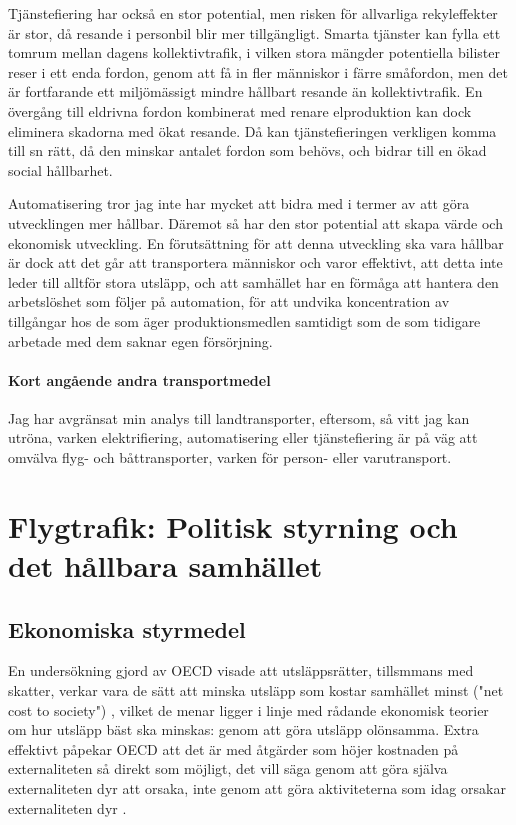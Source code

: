 \documentclass{article}
\begin{document}
Tjänstefiering har också en stor potential, men risken för allvarliga rekyleffekter är stor, då resande i personbil blir mer tillgängligt. Smarta tjänster kan fylla ett tomrum mellan dagens kollektivtrafik, i vilken stora mängder potentiella bilister reser i ett enda fordon, genom att få in fler människor i färre småfordon, men det är fortfarande ett miljömässigt mindre hållbart resande än kollektivtrafik. En övergång till eldrivna fordon kombinerat med renare elproduktion kan dock eliminera skadorna med ökat resande. Då kan tjänstefieringen verkligen komma till sn rätt, då den minskar antalet fordon som behövs, och bidrar till en ökad social hållbarhet.

Automatisering tror jag inte har mycket att bidra med i termer av att göra utvecklingen mer hållbar. Däremot så har den stor potential att skapa värde och ekonomisk utveckling. En förutsättning för att denna utveckling ska vara hållbar är dock att det går att transportera människor och varor effektivt, att detta inte leder till alltför stora utsläpp, och att samhället har en förmåga att hantera den arbetslöshet som följer på automation, för att undvika koncentration av tillgångar hos de som äger produktionsmedlen samtidigt som de som tidigare arbetade med dem saknar egen försörjning.

\paragraph{Kort angående andra transportmedel}
Jag har avgränsat min analys till landtransporter, eftersom, så vitt jag kan utröna, varken elektrifiering, automatisering eller tjänstefiering är på väg att omvälva flyg- och båttransporter, varken för person- eller varutransport.


\clearpage
\section{Flygtrafik: Politisk styrning och det hållbara samhället}

\subsection{Ekonomiska styrmedel}

En undersökning gjord av OECD visade att utsläppsrätter, tillsmmans med skatter, verkar vara de  sätt att minska utsläpp som kostar samhället minst ("net cost to society") , vilket de menar ligger i linje med rådande ekonomisk teorier om hur utsläpp bäst ska minskas: genom att göra utsläpp olönsamma. Extra effektivt påpekar OECD att det är med åtgärder som höjer kostnaden på externaliteten så direkt som möjligt, det vill säga genom att göra själva externaliteten dyr att orsaka, inte genom att göra aktiviteterna som idag orsakar externaliteten dyr .
\end{document}
